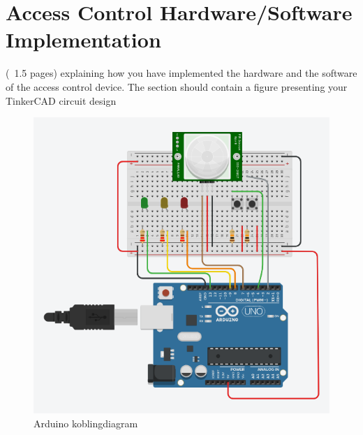\section{Access Control Hardware/Software Implementation }
(~1.5 pages) explaining how you have implemented the hardware and the software of the access control device. The section should contain a figure presenting your TinkerCAD circuit design


\begin{figure}[H]
  \centering
  \includegraphics[scale=0.5]{figs/ArduinoSnapshot.png}
  \caption{Arduino koblingdiagram}
  \label{fig:Arduino}
\end{figure}

\pagebreak